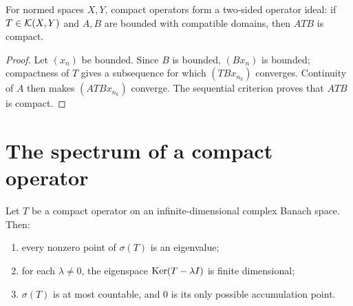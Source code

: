\begin{notelemma}
For normed spaces $X,Y$, compact operators form a two-sided operator ideal:
if $T\in\mathcal{K}(X,Y)$ and $A,B$ are bounded with compatible domains, then
$ATB$ is compact.
\end{notelemma}

\begin{proof}
Let $(x_n)$ be bounded.  Since $B$ is bounded, $(Bx_n)$ is bounded; compactness
of $T$ gives a subsequence for which $(TBx_{n_k})$ converges.  Continuity of
$A$ then makes $(ATBx_{n_k})$ converge.  The sequential criterion proves that
$ATB$ is compact.
\end{proof}

\section{The spectrum of a compact operator}

\begin{notetheorem}
Let $T$ be a compact operator on an infinite-dimensional complex Banach space.
Then:
\begin{enumerate}
  \item every nonzero point of $\sigma(T)$ is an eigenvalue;
  \item for each $\lambda\ne0$, the eigenspace
        $\operatorname{Ker}(T-\lambda I)$ is finite dimensional;
  \item $\sigma(T)$ is at most countable, and $0$ is its only possible
        accumulation point.
\end{enumerate}
\end{notetheorem}

